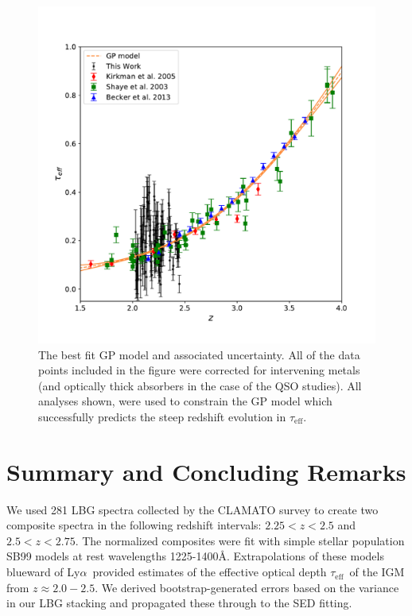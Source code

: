 \documentclass[twocolumn,tight,times]{aastex63}
\newcommand{\mteff}{\tau_\mathrm{eff}}
\newcommand{\teff}{$\mteff$}
\newcommand{\lya}{Ly$\alpha$}
\begin{document}
\begin{figure}[ht]
    \centering
    \includegraphics[width=\columnwidth]{gaussian_model.pdf}
    \caption{The best fit GP model and associated uncertainty. All of the data points included in the figure \citep{Schaye_2003, Kirkman_2005, Becker_2013} were corrected for intervening metals (and optically thick absorbers in the case of the QSO studies). All analyses shown, were used to constrain the GP model which successfully predicts the steep redshift evolution in \teff.}
    \label{fig:gaussian}
\end{figure}

\section{Summary and Concluding Remarks} %
\label{sec:conclusions}

We used 281 LBG spectra collected by the CLAMATO survey to create two composite spectra in the following redshift intervals: $2.25 < z < 2.5$ and $2.5 < z < 2.75$. The normalized composites were fit with simple stellar population SB99 models at rest wavelengths 1225-1400\AA. Extrapolations of these models blueward of \lya\ provided estimates of the effective optical depth \teff\ of the IGM from $z \approx 2.0 -2.5$. We derived bootstrap-generated errors based on the variance in our LBG stacking and propagated these through to the SED fitting.
\end{document}
